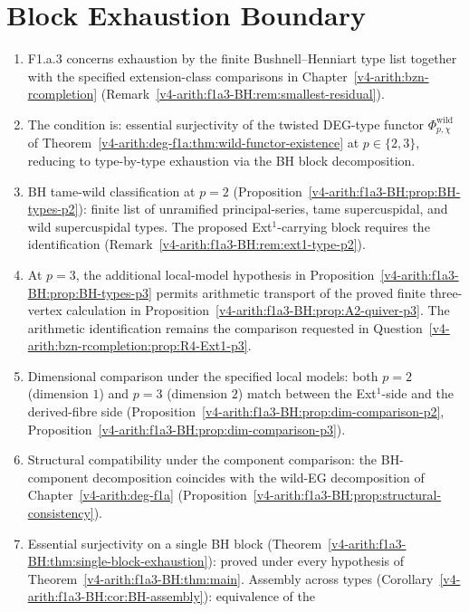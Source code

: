 \section{Block Exhaustion Boundary}
\label{v4-arith:f1a3-BH:summary}

\begin{enumerate}
\item F1.a.3 concerns exhaustion by the finite Bushnell--Henniart
type list together with the specified extension-class comparisons in
Chapter~\ref{v4-arith:bzn-rcompletion}
(Remark~\ref{v4-arith:f1a3-BH:rem:smallest-residual}).
\item The condition is: essential surjectivity of the twisted
DEG-type functor
\(\Phi^{\mathrm{wild}}_{p,\chi}\) of
Theorem~\ref{v4-arith:deg-f1a:thm:wild-functor-existence} at
\(p\in\{2,3\}\), reducing to type-by-type exhaustion via the BH block
decomposition.
\item BH tame-wild classification at \(p=2\)
(Proposition~\ref{v4-arith:f1a3-BH:prop:BH-types-p2}): finite list of unramified
principal-series, tame supercuspidal, and wild supercuspidal types.
The proposed Ext\({}^{1}\)-carrying block requires the identification (Remark~\ref{v4-arith:f1a3-BH:rem:ext1-type-p2}).
\item At \(p=3\), the additional local-model hypothesis in
Proposition~\ref{v4-arith:f1a3-BH:prop:BH-types-p3} permits arithmetic
transport of the proved finite three-vertex calculation in
Proposition~\ref{v4-arith:f1a3-BH:prop:A2-quiver-p3}.
The arithmetic identification remains the comparison requested in
Question~\ref{v4-arith:bzn-rcompletion:prop:R4-Ext1-p3}.
\item Dimensional comparison under the specified local models: both \(p=2\) (dimension \(1\))
and \(p=3\) (dimension \(2\)) match between the Ext\({}^{1}\)-side and the
derived-fibre side
(Proposition~\ref{v4-arith:f1a3-BH:prop:dim-comparison-p2},
Proposition~\ref{v4-arith:f1a3-BH:prop:dim-comparison-p3}).
\item Structural compatibility under the component comparison: the BH-component
decomposition coincides with the wild-EG
decomposition of Chapter~\ref{v4-arith:deg-f1a}
(Proposition~\ref{v4-arith:f1a3-BH:prop:structural-consistency}).
\item Essential surjectivity on a single BH block
(Theorem~\ref{v4-arith:f1a3-BH:thm:single-block-exhaustion}): proved
under every hypothesis of Theorem~\ref{v4-arith:f1a3-BH:thm:main}. Assembly across types
(Corollary~\ref{v4-arith:f1a3-BH:cor:BH-assembly}): equivalence of the

\end{enumerate}
